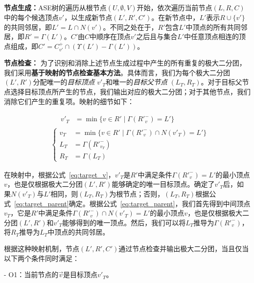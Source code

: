 
\textbf{节点生成：}ASE树的遍历从根节点$(U, \emptyset, V)$开始，依次遍历当前节点$(L, R, C)$中的每个候选顶点$v'$，以生成新节点$(L', R', C')$。在新节点中，$L'$表示$R\cup\{v'\}$的共同邻居，即$L' = L\cap N(v')$。不同之处在于，$R'$包含$L'$中顶点的所有共同邻居，即$R' = \Gamma(L')$。$C'$由$C$中顺序在顶点$v'$之后且与集合$L'$中任意顶点相连的顶点组成，即$C'= C_{v'}^+ \cap (\Upsilon(L') - \Gamma(L'))$。

\textbf{节点检查：} 为了识别和消除上述节点生成过程中产生的所有重复的极大二分团，我们采用\textbf{基于映射的节点检查基本方法}。具体而言，我们为每个极大二分团$(L', R')$分配唯一的\emph{目标顶点} $v'_T$和唯一的\emph{目标父节点} $(L_T, R_T)$。对于目标父节点选择目标顶点所产生的节点，我们输出对应的极大二分团；对于其他节点，我们消除它们产生的重复项。映射的细节如下：

\vspace{-0.5in}
\begin{align}
	\label{eq:target_v}
	& \begin{aligned}
		\hspace{13pt} v'_T &= \min\{v \in R' \mid \Gamma({R'}_{v}^-) = L' \}
	\end{aligned} \\
	\label{eq:target_parent}
	& \left\{
	\begin{aligned}
		v_T &= \min\{v \in R' \mid \Gamma({R'}_{v}^-) \cap N(v'_T) = L'\} \\
		L_T &= \Gamma({R'}_{v_T}^-) \\
		R_T &= \Gamma(L_T)
	\end{aligned}
	\right.
\end{align}


在映射中，根据公式~\ref{eq:target_v}，$v'_T$是$R'$中满足条件$\Gamma({R'}_{v}^-) = L'$的最小顶点$v$，也是仅根据极大二分团$(L', R')$能够确定的唯一目标顶点。确定了$v'_T$后，如果$N(v'_T)$与$L'$相同，则$(L_T, R_T)$为根节点；否则，$(L_T, R_T)$根据公式~\ref{eq:target_parent}确定。根据公式~\ref{eq:target_parent}，我们首先得到中间顶点$v_T$，它是$R'$中满足条件$\Gamma({R'}_{v}^-) \cap N(v'_T) = L'$的最小顶点$v$，也是仅根据极大二分团$(L', R')$和$v'_T$能够得到的唯一顶点。然后，我们可以将$L_T$推导为$\Gamma({R'}_{v}^-)$，将$R_T$推导为$L_T$中顶点的共同邻居。

根据这种映射机制，节点$(L', R', C')$通过节点检查并输出极大二分团，当且仅当以下两个条件同时满足：

- O1：当前节点的$\vec{v}$是目标顶点$v'_T$。

